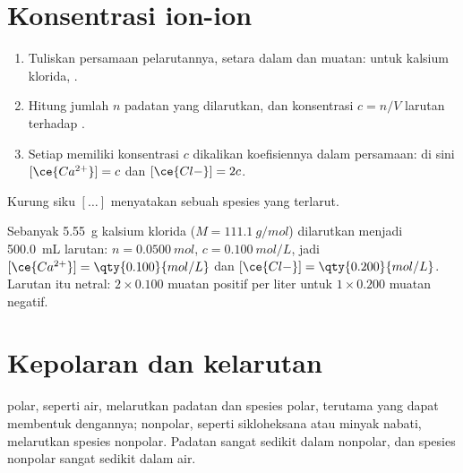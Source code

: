 \section{Konsentrasi ion-ion}

\begin{method}\label{met:g11:dissolution:ions}
\begin{enumerate}
  \item Tuliskan persamaan pelarutannya, setara dalam  dan muatan:
        untuk kalsium klorida, .
  \item Hitung jumlah $n$ padatan yang dilarutkan, dan konsentrasi
        $c = n / V$ larutan terhadap .
  \item Setiap  memiliki konsentrasi $c$ dikalikan koefisiennya dalam
        persamaan: di sini $[\ce{Ca^{2+}}] = c$ dan
        $[\ce{Cl-}] = 2c$.
\end{enumerate}
Kurung siku $[\ldots]$ menyatakan  sebuah spesies yang
terlarut.
\end{method}

\begin{example}\label{ex:g11:dissolution:cacl2}
Sebanyak \qty{5.55}{g} kalsium klorida ($M = \qty{111.1}{g/mol}$)
dilarutkan menjadi \qty{500.0}{mL} larutan: $n = \qty{0.0500}{mol}$,
$c = \qty{0.100}{mol/L}$, jadi $[\ce{Ca^{2+}}] = \qty{0.100}{mol/L}$ dan
$[\ce{Cl-}] = \qty{0.200}{mol/L}$. Larutan itu netral: $2 \times
0.100$ muatan positif per liter untuk $1 \times 0.200$ muatan negatif.
\end{example}

\section{Kepolaran dan kelarutan}

\begin{proposition}\label{prop:g11:dissolution:like}
 polar, seperti air, melarutkan padatan  dan spesies polar,
terutama yang dapat membentuk  dengannya; 
nonpolar, seperti sikloheksana atau minyak nabati, melarutkan spesies
nonpolar. Padatan  sangat sedikit  dalam  nonpolar, dan
spesies nonpolar sangat sedikit  dalam air.
\end{proposition}

